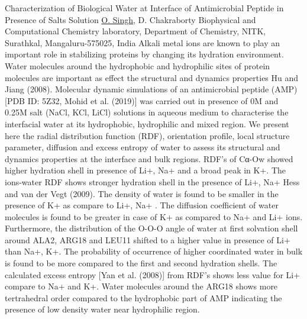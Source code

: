 
    \begin{abstract_online}{Characterization of Biological Water at Interface of Antimicrobial Peptide in Presence of Salts Solution}{%
        \underline{O. Singh}, D. Chakraborty}{%
        }{%
        Biophysical and Computational Chemistry laboratory, Department of Chemistry, NITK, Surathkal, Mangaluru-575025, India}
    Alkali metal ions are known to play an important role in stabilizing proteins by changing its hydration environment. Water molecules around the hydrophobic and hydrophilic sites of protein molecules are important as effect the structural and dynamics properties Hu and Jiang (2008). Molecular dynamic simulations of an antimicrobial peptide (AMP) [PDB ID: 5Z32, Mohid et al. (2019)] was carried out in presence of 0M and 0.25M salt (NaCl, KCl, LiCl) solutions in aqueous medium to characterise the interfacial water at its hydrophobic, hydrophilic and mixed region. We present here the radial distribution function (RDF), orientation profile, local structure parameter, diffusion and excess entropy of water to assess its structural and dynamics properties at the interface and bulk regions. RDF’s of Cα-Ow showed higher hydration shell in presence of Li+, Na+ and a broad peak in K+. The ions-water RDF shows stronger hydration shell in the presence of Li+, Na+ Hess and van der Vegt (2009). The density of water is found to be smaller in the presence of K+ as compare to Li+, Na+ . The diffusion coefficient of water molecules is found to be greater in case of K+ as compared to Na+ and Li+ ions. Furthermore, the distribution of the O-O-O angle of water at first solvation shell around ALA2, ARG18 and LEU11 shifted to a higher value in presence of Li+ than Na+, K+. The probability of occurrence of higher coordinated water in bulk is found to be more compared to the first and second hydration shells. The calculated excess entropy [Yan et al. (2008)] from RDF’s shows less value for Li+ compare to Na+ and K+. Water molecules around the ARG18 shows more tertrahedral order compared to the hydrophobic part of AMP indicating the presence of low density water near hydrophilic region. 
    

\end{abstract_online}
